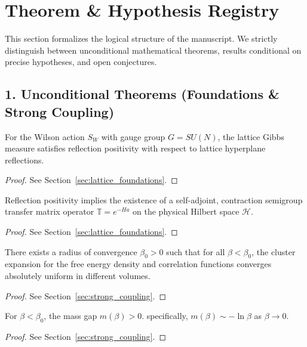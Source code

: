 \chapter*{Theorem \& Hypothesis Registry}

This section formalizes the logical structure of the manuscript. We strictly distinguish between unconditional mathematical theorems, results conditional on precise hypotheses, and open conjectures.

\section*{1. Unconditional Theorems (Foundations \& Strong Coupling)}

\begin{theorem}
\label{thm:reflection-positivity}
For the Wilson action $S_W$ with gauge group $G=SU(N)$, the lattice Gibbs measure satisfies reflection positivity with respect to lattice hyperplane reflections.
\begin{proof} See Section~\ref{sec:lattice_foundations}. \end{proof}
\end{theorem}

\begin{theorem}
\label{thm:transfer-matrix}
Reflection positivity implies the existence of a self-adjoint, contraction semigroup transfer matrix operator $\mathbb{T} = e^{-H a}$ on the physical Hilbert space $\mathcal{H}$.
\begin{proof} See Section~\ref{sec:lattice_foundations}. \end{proof}
\end{theorem}

\begin{theorem}
\label{thm:strong-coupling-convergence}
There exists a radius of convergence $\beta_0 > 0$ such that for all $\beta < \beta_0$, the cluster expansion for the free energy density and correlation functions converges absolutely uniform in different volumes.
\begin{proof} See Section~\ref{sec:strong_coupling}. \end{proof}
\end{theorem}

\begin{theorem}
\label{thm:strong-coupling-gap}
For $\beta < \beta_0$, the mass gap $m(\beta) > 0$. specifically, $m(\beta) \sim - \ln \beta$ as $\beta \to 0$.
\begin{proof} See Section~\ref{sec:strong_coupling}. \end{proof}
\end{theorem}

